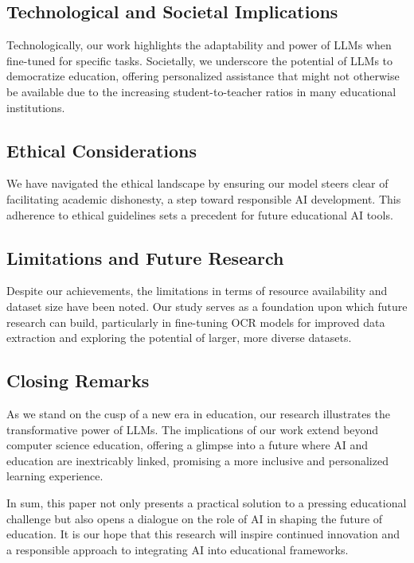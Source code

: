 \documentclass[]{article}
\begin{document}
\subsection{Technological and Societal Implications}
Technologically, our work highlights the adaptability and power of LLMs when fine-tuned for specific tasks. Societally, we underscore the potential of LLMs to democratize education, offering personalized assistance that might not otherwise be available due to the increasing student-to-teacher ratios in many educational institutions.

\subsection{Ethical Considerations}
We have navigated the ethical landscape by ensuring our model steers clear of facilitating academic dishonesty, a step toward responsible AI development. This adherence to ethical guidelines sets a precedent for future educational AI tools.

\subsection{Limitations and Future Research}
Despite our achievements, the limitations in terms of resource availability and dataset size have been noted. Our study serves as a foundation upon which future research can build, particularly in fine-tuning OCR models for improved data extraction and exploring the potential of larger, more diverse datasets.

\subsection{Closing Remarks}
As we stand on the cusp of a new era in education, our research illustrates the transformative power of LLMs. The implications of our work extend beyond computer science education, offering a glimpse into a future where AI and education are inextricably linked, promising a more inclusive and personalized learning experience.

In sum, this paper not only presents a practical solution to a pressing educational challenge but also opens a dialogue on the role of AI in shaping the future of education. It is our hope that this research will inspire continued innovation and a responsible approach to integrating AI into educational frameworks.
\end{document}
